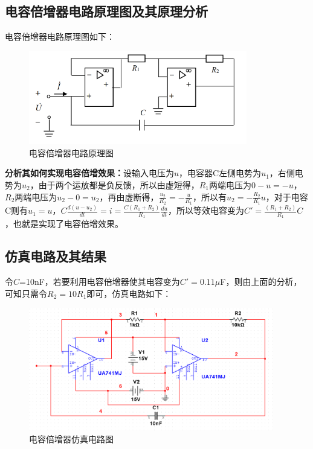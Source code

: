 \documentclass[UTF8]{ctexart}
\begin{document}
\subsection{电容倍增器电路原理图及其原理分析}
电容倍增器电路原理图如下：
\begin{figure}[H]
\centering
\includegraphics[width=0.85\textwidth]{K.png}
\caption{电容倍增器电路原理图}
\end{figure}

\textbf{分析其如何实现电容倍增效果：}设输入电压为$u$，电容器C左侧电势为$u_1$，右侧电势为$u_2$，由于两个运放都是负反馈，所以由虚短得，$R_1$两端电压为$0-u=-u$，$R_2$两端电压为$u_2-0=u_2$，再由虚断得，$\frac{u_2}{R_2}=-\frac{u}{R_1}$，所以有$u_2=-\frac{R_2}{R_1}u$，对于电容C则有$u_1=u$，$C\frac{d(u-u_2)}{dt}=i=\frac{C(R_1+R_2)}{R_1}\frac{du}{dt}$，所以等效电容变为$C'=\frac{(R_1+R_2)}{R_1}C$，也就是实现了电容倍增效果。
\subsection{仿真电路及其结果}
令$C$=10nF，若要利用电容倍增器使其电容变为$C'=0.11\mu$F，则由上面的分析，可知只需令$R_2=10R_1$即可，仿真电路如下：
\begin{figure}[H]
\centering
\includegraphics[width=0.95\textwidth]{L.png}
\caption{电容倍增器仿真电路图}
\end{figure}
\end{document}

